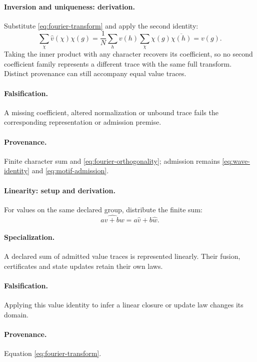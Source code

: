 \paragraph{Inversion and uniqueness: derivation.}
Substitute \eqref{eq:fourier-transform} and apply the second identity:
\begin{equation}
\sum_{\chi}\widehat v(\chi)\chi(g)
=\frac1N\sum_h v(h)\sum_\chi\chi(g)\overline{\chi(h)}
=v(g).
\label{eq:fourier-inversion}
\end{equation}
Taking the inner product with any character recovers its coefficient, so
no second coefficient family represents a different trace with the same
full transform. Distinct provenance can still accompany equal value traces.
\paragraph{Falsification.} A missing coefficient, altered normalization or
unbound trace fails the corresponding representation or admission premise.
\paragraph{Provenance.} Finite character sum and
\eqref{eq:fourier-orthogonality}; admission remains
\eqref{eq:wave-identity} and \eqref{eq:motif-admission}.

\paragraph{Linearity: setup and derivation.}
For values on the same declared group, distribute the finite sum:
\begin{equation}
\widehat{av+bw}=a\widehat v+b\widehat w.
\label{eq:fourier-linearity}
\end{equation}
\paragraph{Specialization.} A declared sum of admitted value traces is
represented linearly. Their fusion, certificates and state updates retain
their own laws.
\paragraph{Falsification.} Applying this value identity to infer a linear
closure or update law changes its domain.
\paragraph{Provenance.} Equation \eqref{eq:fourier-transform}.

